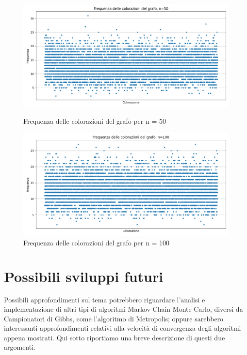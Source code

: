 \documentclass{article}
\begin{document}
\begin{figure}[!ht]
    \centering
    \begin{minipage}{0.45\textwidth}
        \centering
        \includegraphics[width=\linewidth]{img/grafico_frequenza_colorazioni_n50.png}
        \caption{Frequenza delle colorazioni del grafo per n = 50}
        \label{fig:immagine1}
    \end{minipage}\hfill
    \begin{minipage}{0.45\textwidth}
        \centering
        \includegraphics[width=\linewidth]{img/grafico_frequenza_colorazioni_n100.png}
        \caption{Frequenza delle colorazioni del grafo per n = 100}
        \label{fig:immagine2}
    \end{minipage}
\end{figure}

\newpage
\section{Possibili sviluppi futuri}

Possibili approfondimenti sul tema potrebbero riguardare l'analisi e implementazione di altri tipi di algoritmi Markov Chain Monte Carlo, diversi da Campionatori di Gibbs, come l'algoritmo di Metropolis; oppure sarebbero interessanti approfondimenti relativi alla velocità di convergenza degli algoritmi appena mostrati. Qui sotto riportiamo una breve descrizione di questi due argomenti. 
\end{document}
